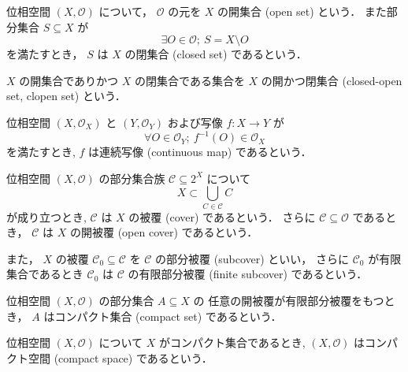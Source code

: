 \documentclass[titlepage]{ltjsreport}
\begin{document}
\begin{definition}
  位相空間 $(X,\mathcal{O})$ について，
  $\mathcal{O}$ の元を $X$ の開集合 (open set) という．
  また部分集合 $S\subseteq X$ が
  \begin{equation}
    \exists O\in\mathcal{O};\ S=X\setminus O
  \end{equation}
  を満たすとき，
  $S$ は $X$ の閉集合 (closed set) であるという．

  $X$ の開集合でありかつ $X$ の閉集合である集合を
  $X$ の開かつ閉集合 (closed-open set, clopen set) という．
\end{definition}

\begin{definition}[連続写像]\label{def:continuous-map}
  位相空間 $(X,\mathcal{O}_X)$ と $(Y,\mathcal{O}_Y)$ および写像 $f:X\to Y$ が
  \begin{equation}
    \forall O\in\mathcal{O}_Y;\ f^{-1}(O)\in\mathcal{O}_X
  \end{equation}
  を満たすとき,
  $f$ は連続写像 (continuous map) であるという．
\end{definition}

\begin{definition}
  位相空間 $(X,\mathcal{O})$ の部分集合族 $\mathcal{C}\subseteq2^X$ について
  \begin{equation}
    X\subset\bigcup_{C\in\mathcal{C}}C
  \end{equation}
  が成り立つとき,
  $\mathcal{C}$ は $X$ の被覆 (cover) であるという．
  さらに $\mathcal{C}\subseteq\mathcal{O}$ であるとき，
  $\mathcal{C}$ は $X$ の開被覆 (open cover) であるという．

  また，
  $X$ の被覆 $\mathcal{C}_0\subseteq\mathcal{C}$ を
  $\mathcal{C}$ の部分被覆 (subcover) といい，
  さらに $\mathcal{C}_0$ が有限集合であるとき
  $\mathcal{C}_0$ は $\mathcal{C}$ の有限部分被覆 (finite subcover) であるという．
\end{definition}

\begin{definition}[コンパクト集合]
  位相空間 $(X,\mathcal{O})$ の部分集合 $A\subseteq X$ の
  任意の開被覆が有限部分被覆をもつとき，
  $A$ はコンパクト集合 (compact set) であるという．
\end{definition}

\begin{definition}[コンパクト空間]
  位相空間 $(X,\mathcal{O})$ について $X$ がコンパクト集合であるとき,
  $(X,\mathcal{O})$ はコンパクト空間 (compact space) であるという．
\end{definition}
\end{document}
